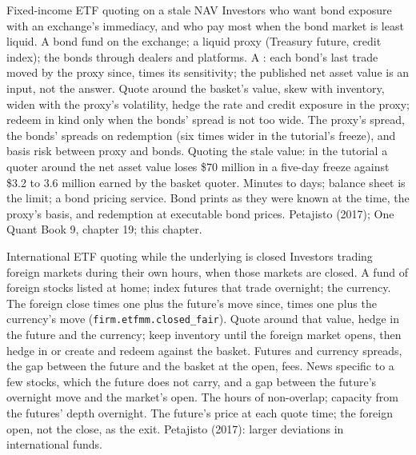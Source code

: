 \begin{strategyfile}{Fixed-income ETF quoting on a stale NAV}\label{strat:hf:etf-market-making:bond}
 Investors who want bond exposure with an exchange's immediacy, and who pay most when the bond market is least liquid.
 A bond fund on the exchange; a liquid proxy (Treasury future, credit index); the bonds through dealers and platforms.
 A : each bond's last trade moved by the proxy since, times its sensitivity; the published net asset value is an input,
not the answer.
 Quote around the basket's value, skew with inventory, widen with the proxy's volatility, hedge the rate and credit
exposure in the proxy; redeem in kind only when the bonds' spread is not too wide.
 The proxy's spread, the bonds' spreads on redemption (six times wider in the tutorial's freeze), and basis risk between proxy and
bonds.
 Quoting the stale value: in the tutorial a quoter around the net asset value loses \$70 million in a five-day freeze against
\$3.2 to 3.6 million earned by the basket quoter.
 Minutes to days; balance sheet is the limit; a bond pricing service.
 Bond prints as they were known at the time, the proxy's basis, and redemption at executable bond prices.
 Petajisto (2017); One Quant Book 9, chapter 19; this chapter.
\end{strategyfile}

\begin{strategyfile}{International ETF quoting while the underlying is closed}\label{strat:hf:etf-market-making:international}
 Investors trading foreign markets during their own hours, when those markets are closed.
 A fund of foreign stocks listed at home; index futures that trade overnight; the currency.
 The foreign close times one plus the future's move since, times one plus the currency's move (\texttt{firm.etfmm.closed\_fair}).
 Quote around that value, hedge in the future and the currency; keep inventory until the foreign market opens, then
hedge in or create and redeem against the basket.
 Futures and currency spreads, the gap between the future and the basket at the open, fees.
 News specific to a few stocks, which the future does not carry, and a gap between the future's overnight move and the market's
open.
 The hours of non-overlap; capacity from the futures' depth overnight.
 The future's price at each quote time; the foreign open, not the close, as the exit.
 Petajisto (2017): larger deviations in international funds.
\end{strategyfile}


